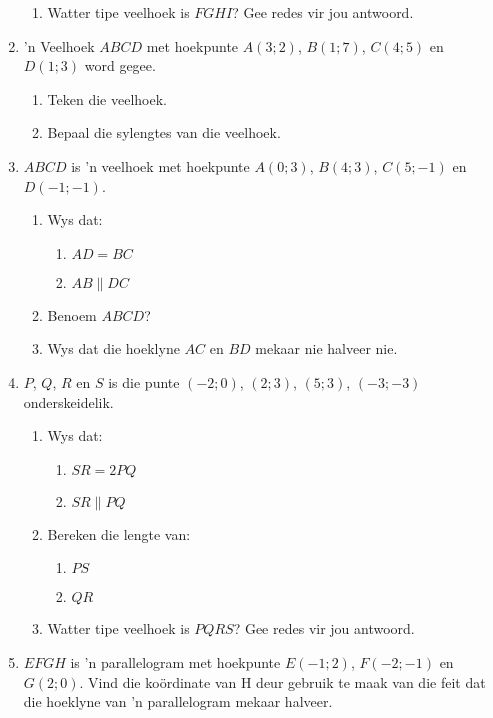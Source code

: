 \begin{eocexercises}{}
\begin{enumerate}[noitemsep, label=\textbf{\arabic*}. ]
\begin{enumerate}[noitemsep, label=\textbf{(\alph*)} ]
\item Watter tipe veelhoek is  $FGHI$? Gee redes vir jou antwoord.
\end{enumerate}
\item  ’n Veelhoek $ABCD$ met hoekpunte $A(3;2)$, $B(1;7)$, $C(4;5)$ en $D(1;3)$ word gegee.
\begin{enumerate}[noitemsep, label=\textbf{(\alph*)} ]
\item  Teken die veelhoek.
\item  Bepaal die sylengtes van die veelhoek.
\end{enumerate}
\item $ABCD$ is ’n veelhoek met hoekpunte $A(0;3)$, $B(4;3)$, $C(5;-1)$ en $D(-1;-1)$.
\begin{enumerate}[noitemsep, label=\textbf{(\alph*)} ]
\item Wys dat:
\begin{enumerate}[noitemsep, label=\textbf{(\roman*)} ]
\item $AD = BC$
\item $AB \parallel DC$
\end{enumerate}
\item Benoem $ABCD$?
\item Wys dat die hoeklyne $AC$ en $BD$ mekaar nie halveer nie.
\end{enumerate}
\item $P$, $Q$, $R$ en $S$ is die punte $(-2;0)$, $(2;3)$, $(5;3)$, $(-3;-3)$ onderskeidelik.
\begin{enumerate}[noitemsep, label=\textbf{(\alph*)} ]
\item Wys dat:
\begin{enumerate}[noitemsep, label=\textbf{(\roman*)} ]
\item $SR = 2PQ$
\item $SR \parallel PQ$
\end{enumerate}
\item Bereken die lengte van:
\begin{enumerate}[noitemsep, label=\textbf{(\roman*)} ]
\item $PS$
\item $QR$
\end{enumerate}
\item Watter tipe veelhoek is $PQRS$? Gee redes vir jou antwoord.
\end{enumerate}
\item $EFGH$ is ’n parallelogram met hoekpunte $E(-1;2)$, $F(-2;-1)$ en $G(2;0)$. Vind die koördinate van H deur gebruik te maak van die feit dat die hoeklyne van ’n parallelogram mekaar halveer.\newline

\end{enumerate}
\end{eocexercises}
